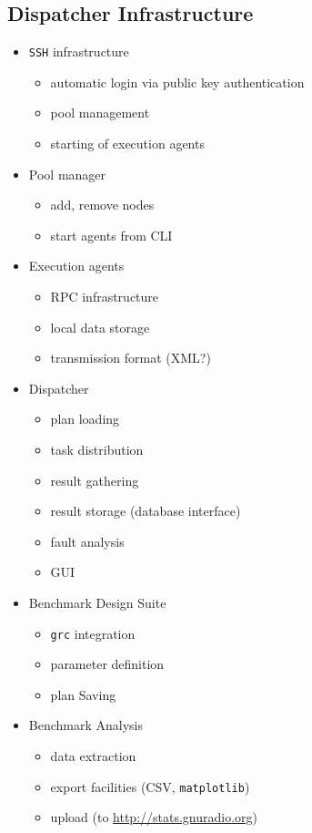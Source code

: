 \documentclass[a4paper]{IEEEtran}
\newcommand{\grc}{\texttt{grc}\xspace}
\begin{document}
\subsection{Dispatcher Infrastructure}
\begin{itemize}
\item \texttt{SSH} infrastructure
	\begin{itemize}
	\item automatic login via public key authentication
	\item pool management
	\item starting of execution agents
	\end{itemize}
\item Pool manager
	\begin{itemize}
	\item add, remove nodes
	\item start agents from CLI
	\end{itemize}
\item Execution agents
	\begin{itemize}
	\item RPC infrastructure
	\item local data storage
	\item transmission format (XML?)
	\end{itemize}
\item Dispatcher
	\begin{itemize}
	\item plan loading
	\item task distribution
	\item result gathering
	\item result storage (database interface)
	\item fault analysis
	\item GUI
	\end{itemize}
\item Benchmark Design Suite
	\begin{itemize}
	\item \grc integration
	\item parameter definition
	\item plan Saving
	\end{itemize}
\item Benchmark Analysis
	\begin{itemize}
	\item data extraction
	\item export facilities (CSV, \texttt{matplotlib})
	\item upload (to \url{http://stats.gnuradio.org})
	\end{itemize}
\end{itemize}
\end{document}

